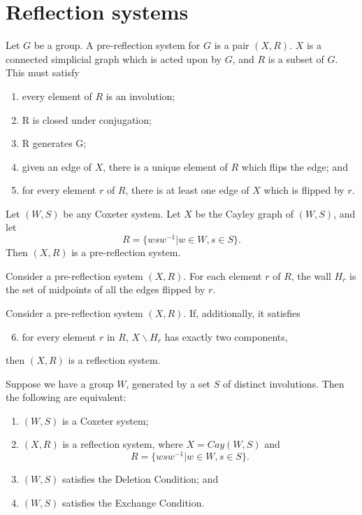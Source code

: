 \documentclass[12pt]{article}
\begin{document}
\section{Reflection systems}
\begin{definition}
    Let $G$ be a group. A pre-reflection system for $G$ is a pair $(X,R)$. $X$ is a connected simplicial graph which is acted upon by $G$, and $R$ is a subset of $G$. This must satisfy
    \begin{enumerate}
        \item every element of $R$ is an involution;
        \item R is closed under conjugation;
        \item R generates G;
        \item given an edge of $X$, there is a unique element of $R$ which flips the edge; and
        \item for every element $r$ of $R$, there is at least one edge of $X$ which is flipped by $r$. 
    \end{enumerate}
\end{definition}

\begin{example}
    Let $(W,S)$ be any Coxeter system. Let $X$ be the Cayley graph of $(W,S)$, and let
    \[ R=\{wsw^{-1}|w\in W, s\in S\}. \]
    Then $(X,R)$ is a pre-reflection system.
\end{example}

\begin{definition}
    Consider a pre-reflection system $(X,R)$. For each element $r$ of $R$, the wall $H_r$ is the set of midpoints of all the edges flipped by $r$. 
\end{definition}

\begin{definition}
    Consider a pre-reflection system $(X,R)$. If, additionally, it satisfies
    \begin{enumerate}
        \setcounter{enumi}{5}
        \item for every element $r$ in $R$, $X\backslash H_r$ has exactly two components,
    \end{enumerate}
    then $(X,R)$ is a reflection system. 
\end{definition}


\begin{theorem}
    Suppose we have a group $W$, generated by a set $S$ of distinct involutions. Then the following are equivalent:
    \begin{enumerate}
        \item $(W,S)$ is a Coxeter system;
        \item $(X,R)$ is a reflection system, where $X=Cay(W,S)$ and \[R=\{wsw^{-1}|w\in W, s\in S\}.\]
        \item $(W,S)$ satisfies the Deletion Condition; and
        \item $(W,S)$ satisfies the Exchange Condition.
    \end{enumerate}
\end{theorem}
\end{document}
